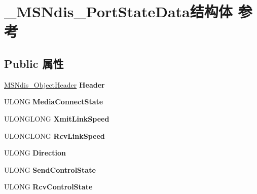 \hypertarget{struct___m_s_ndis___port_state_data}{}\section{\+\_\+\+M\+S\+Ndis\+\_\+\+Port\+State\+Data结构体 参考}
\label{struct___m_s_ndis___port_state_data}
\subsection*{Public 属性}
\begin{DoxyCompactItemize}
\item 
\mbox{\label{struct___m_s_ndis___port_state_data_ae91be51380c24f2ad567d4226e64c8e6}} 
\hyperlink{struct___m_s_ndis___object_header}{M\+S\+Ndis\+\_\+\+Object\+Header} {\bfseries Header}
\item 
\mbox{\label{struct___m_s_ndis___port_state_data_af8b9ad24ab3a09930741c76720e0e5b5}} 
U\+L\+O\+NG {\bfseries Media\+Connect\+State}
\item 
\mbox{\label{struct___m_s_ndis___port_state_data_a5e91b3d8dcd834a5675cdeca2857d7c8}} 
U\+L\+O\+N\+G\+L\+O\+NG {\bfseries Xmit\+Link\+Speed}
\item 
\mbox{\label{struct___m_s_ndis___port_state_data_aebf1efdad786242a9af4bff4437b419a}} 
U\+L\+O\+N\+G\+L\+O\+NG {\bfseries Rcv\+Link\+Speed}
\item 
\mbox{\label{struct___m_s_ndis___port_state_data_a12aac9712027815a58dcc4f9f9d0824d}} 
U\+L\+O\+NG {\bfseries Direction}
\item 
\mbox{\label{struct___m_s_ndis___port_state_data_a28c5a215512cea7f5bafee6b361b893c}} 
U\+L\+O\+NG {\bfseries Send\+Control\+State}
\item 
\mbox{\label{struct___m_s_ndis___port_state_data_ac7f62af8af874c4b482c19daa5e68ab0}} 
U\+L\+O\+NG {\bfseries Rcv\+Control\+State}
\item 

\end{DoxyCompactItemize}
